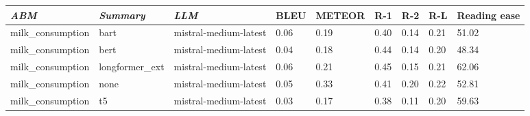 \begin{tabular}{|l|l|l|l|l|l|l|l|l|}
\hline
\textit{\textbf{ABM}} & \textit{\textbf{Summary}} & \textit{\textbf{LLM}} & BLEU & METEOR & R-1 & R-2 & R-L & Reading ease \\
 \hline
 milk\_consumption & bart & mistral-medium-latest & 0.06 & 0.19 & 0.40 & 0.14 & 0.21 & 51.02 \\
 \hline
 milk\_consumption & bert & mistral-medium-latest & 0.04 & 0.18 & 0.44 & 0.14 & 0.20 & 48.34 \\
 \hline
 milk\_consumption & longformer\_ext & mistral-medium-latest & 0.06 & 0.21 & 0.45 & 0.15 & 0.21 & 62.06 \\
 \hline
 milk\_consumption & none & mistral-medium-latest & 0.05 & 0.33 & 0.41 & 0.20 & 0.22 & 52.81 \\
 \hline
 milk\_consumption & t5 & mistral-medium-latest & 0.03 & 0.17 & 0.38 & 0.11 & 0.20 & 59.63 \\
\hline
\end{tabular}
